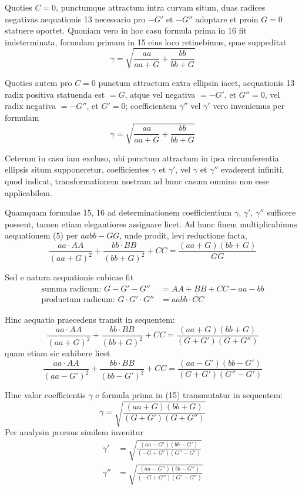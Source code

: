 \documentclass[12pt,a4paper]{article}
\begin{document}
Quoties $C=0$, punctumque attractum intra curvam situm, duas radices negativas aequationis 13 necessario pro $-G'$ et $-G''$ adoptare et proin $G=0$ statuere oportet. Quoniam vero in hoc casu formula prima in 16 fit indeterminata, formulam primam in 15 eius loco retinebimus, quae suppeditat
\[
\gamma = \sqrt{\frac{aa}{aa+G} + \frac{bb}{bb+G}}
\]

Quoties autem pro $C=0$ punctum attractum extra ellipsin iacet, aequationis 13 radix positiva statuenda est $=G$, atque vel negativa $=-G'$, et $G''=0$, vel radix negativa $=-G''$, et $G'=0$; coefficientem $\gamma''$ vel $\gamma'$ vero inveniemus per formulam
\[
\gamma = \sqrt{\frac{aa}{aa+G} + \frac{bb}{bb+G}}
\]

Ceterum in casu iam excluso, ubi punctum attractum in ipsa circumferentia ellipsis situm supponeretur, coefficientes $\gamma$ et $\gamma'$, vel $\gamma$ et $\gamma''$ evaderent infiniti, quod indicat, transformationem nostram ad hunc casum omnino non esse applicabilem.

Quamquam formulae 15, 16 ad determinationem coefficientium $\gamma$, $\gamma'$, $\gamma''$ sufficere possent, tamen etiam elegantiores assignare licet. Ad hunc finem multiplicabimus aequationem (5) per $aabb-GG$, unde prodit, levi reductione facta,
\[
\frac{aa\cdot AA}{(aa+G)^2} + \frac{bb\cdot BB}{(bb+G)^2} + CC = \frac{(aa+G)(bb+G)}{GG}
\]

Sed e natura aequationis cubicae fit
\[
\begin{aligned}
\text{summa radicum: } G-G'-G'' &= AA+BB+CC-aa-bb \\
\text{productum radicum: } G\cdot G'\cdot G'' &= aabb\cdot CC
\end{aligned}
\]

Hinc aequatio praecedens transit in sequentem:
\[
\frac{aa\cdot AA}{(aa+G)^2} + \frac{bb\cdot BB}{(bb+G)^2} + CC = \frac{(aa+G)(bb+G)}{(G+G')(G+G'')}
\]
quam etiam sic exhibere licet
\[
\frac{aa\cdot AA}{(aa-G')^2} + \frac{bb\cdot BB}{(bb-G')^2} + CC = \frac{(aa-G')(bb-G')}{(G+G')(G''-G')}
\]

Hinc valor coefficientis $\gamma$ e formula prima in (15) transmutatur in sequentem:
\[
\gamma = \sqrt{\frac{(aa+G)(bb+G)}{(G+G')(G+G'')}}
\]
Per analysin prorsus similem invenitur
\[
\begin{aligned}
\gamma' &= \sqrt{\frac{(aa-G')(bb-G')}{(-G+G')(G''-G')}} \\
\gamma'' &= \sqrt{\frac{(aa-G'')(bb-G'')}{(-G+G'')(G'-G'')}}
\end{aligned}
\tag{18,19}
\]
\end{document}

